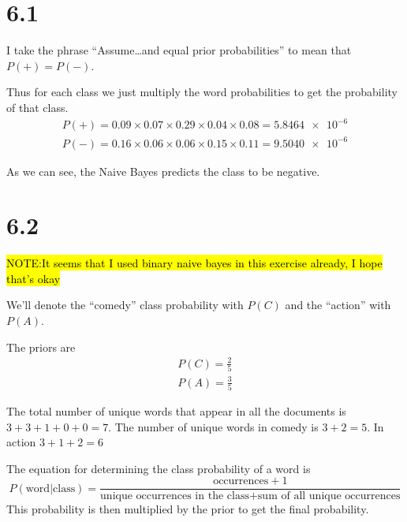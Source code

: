 \section*{6.1}

I take the phrase ``Assume\dots and equal prior probabilities'' to mean that
\(P(+) = P(-)\).

Thus for each class we just multiply the word probabilities to get the
probability of that class.
\begin{equation}
  \begin{aligned}
    P(+) = 0.09 \times 0.07 \times 0.29 \times 0.04 \times 0.08 =
    \num{5.8464e-6} \\
    P(-) = 0.16 \times 0.06 \times 0.06 \times 0.15 \times 0.11 = \num{9.5040e-6}
  \end{aligned}
\end{equation}

As we can see, the Naive Bayes predicts the class to be negative.


\section*{6.2}

\hl{NOTE:\@ It seems that I used binary naive bayes in this exercise already, I
hope that's okay}

\vspace{1cm}

We'll denote the ``comedy'' class probability with \(P(C)\) and the ``action''
with \(P(A)\).

The priors are
\begin{equation}
  \begin{aligned}
    P(C) = \frac{2}{5} \\
    P(A) = \frac{3}{5}
  \end{aligned}
\end{equation}

The total number of unique words that appear in all the documents is
\( 3 + 3 + 1 + 0 + 0 = 7 \).
The number of unique words in comedy is \( 3 + 2 = 5 \).
In action \( 3 + 1 + 2 = 6 \)

The equation for determining the class probability of a word is
\begin{equation}
  P(\text{word}|\text{class}) = \frac{\text{occurrences} + 1}{\text{unique
  occurrences in the class} + \text{sum of all unique occurrences}}
\end{equation}
This probability is then multiplied by the prior to get the final probability.

